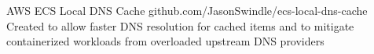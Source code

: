 \projectitem
    {AWS ECS Local DNS Cache}
    {github.com/JasonSwindle/ecs-local-dns-cache}
    {Created to allow faster DNS resolution for cached items and to mitigate containerized workloads from overloaded upstream DNS providers}